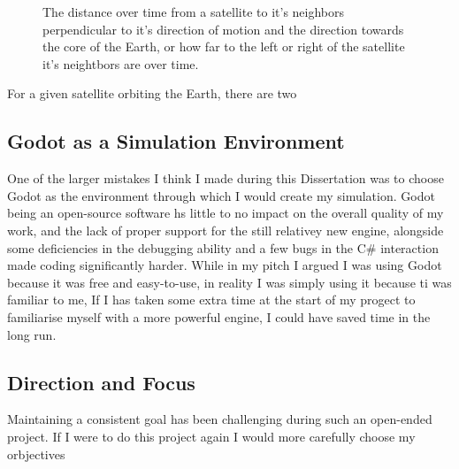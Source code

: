\documentclass[12pt]{article}
\begin{document}
\begin{figure}
\label{fig:Sideways of Satellites}
\caption{The distance over time from a satellite to it's neighbors perpendicular to it's direction of motion and the direction towards the core of the Earth, or how far to the left or right of the satellite it's neightbors are over time.}
\end{figure}

For a given satellite orbiting the Earth, there are two 

\subsection{Godot as a Simulation Environment}

One of the larger mistakes I think I made during this Dissertation was to choose Godot as the environment through which I would create my simulation. Godot being an open-source software hs little to no impact on the overall quality of my work, and the lack of proper support for the still relativey new engine, alongside some deficiencies in the debugging ability and a few bugs in the C\# interaction made coding significantly harder. While in my pitch I argued I was using Godot because it was free and easy-to-use, in reality I was simply using it because ti was familiar to me, If I has taken some extra time at the start of my progect to familiarise myself with a more powerful engine, I could have saved time in the long run.

\subsection{Direction and Focus}

Maintaining a consistent goal has been challenging during such an open-ended project. If I were to do this project again I would more carefully choose my orbjectives %
\end{document}
